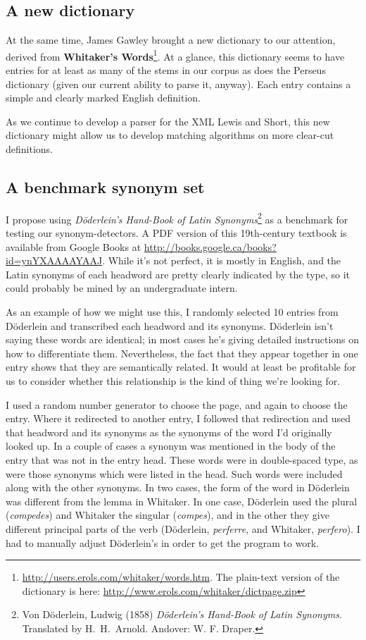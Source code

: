 \documentclass[]{article}
\begin{document}
	\subsection{A new dictionary}
		
		At the same time, James Gawley brought a new dictionary to our attention, derived from \textbf{Whitaker's Words}\footnote{\url{http://users.erols.com/whitaker/words.htm}.  The plain-text version of the dictionary is here: \url{http://www.erols.com/whitaker/dictpage.zip}}.  At a glance, this dictionary seems to have entries for at least as many of the stems in our corpus as does the Perseus dictionary (given our current ability to parse it, anyway).  Each entry contains a simple and clearly marked English definition.  
		
		As we continue to develop a parser for the XML Lewis and Short, this new dictionary might allow us to develop matching algorithms on more clear-cut definitions.
		
	\subsection{A benchmark synonym set}
	
		I propose using \emph{Döderlein's Hand-Book of Latin Synonyms}\footnote{Von Döderlein, Ludwig (1858) \emph{Döderlein's Hand-Book of Latin Synonyms}.  Translated by H.\ H.\ Arnold.  Andover: W. F. Draper.} as a benchmark for testing our synonym-detectors.  A PDF version of this 19th-century textbook is available from Google Books at \url{http://books.google.ca/books?id=ynYXAAAAYAAJ}.  While it's not perfect, it is mostly in English, and the Latin synonyms of each headword are pretty clearly indicated by the type, so it could probably be mined by an undergraduate intern.
		
		As an example of how we might use this, I randomly selected 10 entries from Döderlein and transcribed each headword and its synonyms.  Döderlein isn't saying these words are identical; in most cases he's giving detailed instructions on how to differentiate them.  Nevertheless, the fact that they appear together in one entry shows that they are semantically related.  It would at least be profitable for us to consider whether this relationship is the kind of thing we're looking for.
		
		I used a random number generator to choose the page, and again to choose the entry.  Where it redirected to another entry, I followed that redirection and used that headword and its synonyms as the synonyms of the word I'd originally looked up.  In a couple of cases a synonym was mentioned in the body of the entry that was not in the entry head.  These words were in double-spaced type, as were those synonyms which were listed in the head.  Such words were included along with the other synonyms.  In two cases, the form of the word in Döderlein was different from the lemma in Whitaker.  In one case, Döderlein used the plural (\textit{compedes}) and Whitaker the singular (\textit{compes}), and in the other they give different principal parts of the verb (Döderlein, \textit{perferre}, and Whitaker, \textit{perfero}).  I had to manually adjust Döderlein's in order to get the program to work.
		
\end{document}
